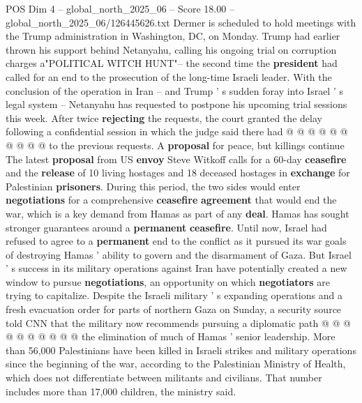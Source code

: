 \begin{textsample}{POS Dim 4 – global\_north\_2025\_06 – Score 18.00 – global\_north\_2025\_06/126445626.txt}
Dermer is scheduled to hold meetings with the Trump administration in Washington, DC, on Monday.
Trump had earlier thrown his support behind Netanyahu, calling his ongoing trial on corruption charges a"POLITICAL WITCH HUNT"-- the second time the \textbf{president} had called for an end to the prosecution of the long-time Israeli leader.
With the conclusion of the operation in Iran -- and Trump ' s sudden foray into Israel ' s legal system -- Netanyahu has requested to postpone his upcoming trial sessions this week.
After twice \textbf{rejecting} the requests, the court granted the delay following a confidential session in which the judge said there had @ @ @ @ @ @ @ @ @ @ to the previous requests.
A \textbf{proposal} for peace, but killings continue The latest \textbf{proposal} from US \textbf{envoy} Steve Witkoff calls for a 60-day \textbf{ceasefire} and the \textbf{release} of 10 living hostages and 18 deceased hostages in \textbf{exchange} for Palestinian \textbf{prisoners}.
During this period, the two sides would enter \textbf{negotiations} for a comprehensive \textbf{ceasefire} \textbf{agreement} that would end the war, which is a key demand from Hamas as part of any \textbf{deal}.
Hamas has sought stronger guarantees around a \textbf{permanent} \textbf{ceasefire}.
Until now, Israel had refused to agree to a \textbf{permanent} end to the conflict as it pursued its war goals of destroying Hamas ' ability to govern and the disarmament of Gaza.
But Israel ' s success in its military operations against Iran have potentially created a new window to pursue \textbf{negotiations}, an opportunity on which \textbf{negotiators} are trying to capitalize.
Despite the Israeli military ' s expanding operations and a fresh evacuation order for parts of northern Gaza on Sunday, a security source told CNN that the military now recommends pursuing a diplomatic path @ @ @ @ @ @ @ @ @ @ the elimination of much of Hamas ' senior leadership.
More than 56,000 Palestinians have been killed in Israeli strikes and military operations since the beginning of the war, according to the Palestinian Ministry of Health, which does not differentiate between militants and civilians.
That number includes more than 17,000 children, the ministry said.

\end{textsample}
